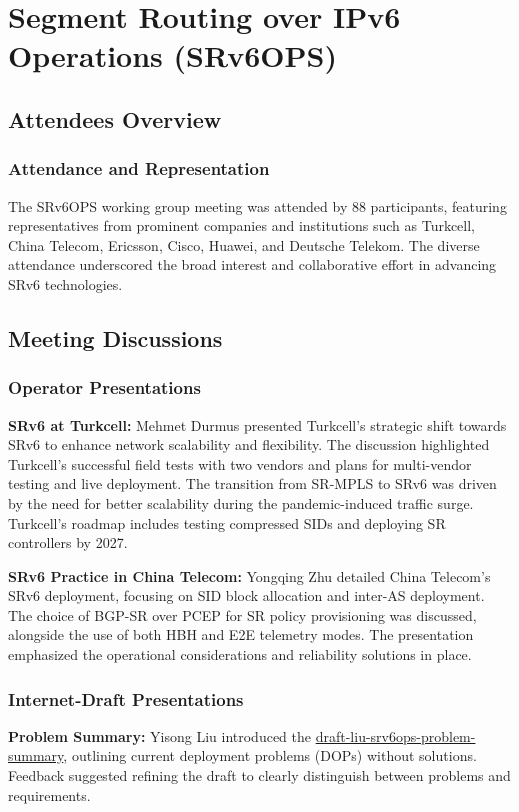 \documentclass{article}
\begin{document}
\newpage

\section{Segment Routing over IPv6 Operations (SRv6OPS)}

\subsection{Attendees Overview}
\subsubsection{Attendance and Representation}
The SRv6OPS working group meeting was attended by 88 participants, featuring representatives from prominent companies and institutions such as Turkcell, China Telecom, Ericsson, Cisco, Huawei, and Deutsche Telekom. The diverse attendance underscored the broad interest and collaborative effort in advancing SRv6 technologies.

\subsection{Meeting Discussions}

\subsubsection{Operator Presentations}
\textbf{SRv6 at Turkcell:} Mehmet Durmus presented Turkcell's strategic shift towards SRv6 to enhance network scalability and flexibility. The discussion highlighted Turkcell's successful field tests with two vendors and plans for multi-vendor testing and live deployment. The transition from SR-MPLS to SRv6 was driven by the need for better scalability during the pandemic-induced traffic surge. Turkcell's roadmap includes testing compressed SIDs and deploying SR controllers by 2027.

\textbf{SRv6 Practice in China Telecom:} Yongqing Zhu detailed China Telecom's SRv6 deployment, focusing on SID block allocation and inter-AS deployment. The choice of BGP-SR over PCEP for SR policy provisioning was discussed, alongside the use of both HBH and E2E telemetry modes. The presentation emphasized the operational considerations and reliability solutions in place.

\subsubsection{Internet-Draft Presentations}
\textbf{Problem Summary:} Yisong Liu introduced the \href{https://datatracker.ietf.org/doc/html/draft-liu-srv6ops-problem-summary}{draft-liu-srv6ops-problem-summary}, outlining current deployment problems (DOPs) without solutions. Feedback suggested refining the draft to clearly distinguish between problems and requirements.
\end{document}
